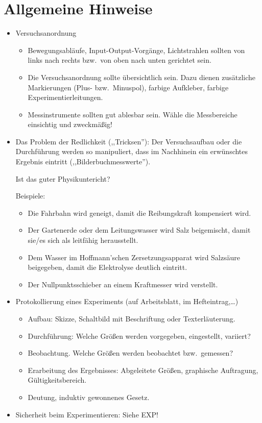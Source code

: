 \section{Allgemeine Hinweise}
\begin{itemize}

	\item
	Versuchsanordnung
	\begin{itemize}
		\item
		Bewegungsabl\"{a}ufe, Input-Output-Vorg\"{a}nge, Lichtstrahlen
		sollten von links nach rechts bzw.\ von oben nach unten
		gerichtet sein.
		
		\item
		Die Versuchsanordnung sollte \"{u}bersichtlich sein.
		Dazu dienen zus\"{a}tzliche Markierungen (Plus- bzw.\ Minuspol),
		farbige Aufkleber, farbige Experimentierleitungen.
		\item
		Messinstrumente sollten gut ablesbar sein.
		W\"{a}hle die Messbereiche einsichtig und zweckm\"{a}{\ss}ig!
	\end{itemize}
	
	\item
	Das Problem der Redlichkeit (,,Tricksen''):
	Der Versuchsaufbau oder die Durchf\"{u}hrung werden so
	manipuliert, dass im Nachhinein ein erw\"{u}nschtes Ergebnis
	eintritt (,,Bilderbuchmesswerte'').
	
	Ist das guter Physikuntericht?
	
	Beispiele:
	\begin{itemize}
		\item
		Die Fahrbahn wird geneigt, damit die Reibungskraft
		kompensiert wird.
		\item
		Der Gartenerde oder dem Leitungswasser wird Salz beigemischt,
		damit sie/es sich als leitf\"{a}hig herausstellt.
		\item
		Dem Wasser im Hoffmann'schen Zersetzungsapparat wird Salzs\"{a}ure
		beigegeben, damit die Elektrolyse deutlich eintritt.
		\item
		Der Nullpunktsschieber an einem Kraftmesser wird verstellt.
	\end{itemize}
	
	\item
	Protokollierung eines Experiments
	(auf Arbeitsblatt, im Hefteintrag,\dots)
	\begin{itemize}
		\item
		Aufbau: Skizze, Schaltbild mit
		Beschriftung oder Texterl\"{a}uterung.
		\item
		Durchf\"{u}hrung:
		Welche Gr\"{o}{\ss}en werden vorgegeben, eingestellt, variiert?
		\item
		Beobachtung.
		Welche Gr\"{o}{\ss}en werden beobachtet bzw.\ gemessen?
		\item
		Erarbeitung des Ergebnisses: Abgeleitete Gr\"{o}{\ss}en,
		graphische Auftragung, G\"{u}ltigkeitsbereich.
		\item
		Deutung, induktiv gewonnenes Gesetz.
	\end{itemize}
	
	\item
	Sicherheit beim Experimentieren: Siehe EXP!
\end{itemize}

